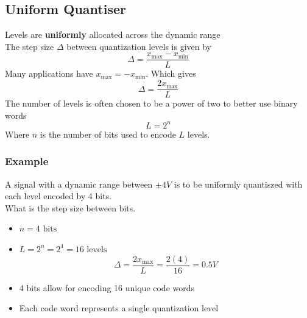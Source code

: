 \documentclass[oneside]{book}
\begin{document}
            \subsection{Uniform Quantiser}
                Levels are \textbf{uniformly} allocated across the dynamic range\\
                The step size $\Delta$ between quantization levels is given by
                \begin{equation*}
                    \Delta = \frac{x_{\text{max}} - x_{\text{min}}}{L}
                \end{equation*}
                Many applications have $x_{\text{max}} = -x_{\text{min}}$. Which gives
                \begin{equation*}
                    \Delta = \frac{2x_{\text{max}}}{L}
                \end{equation*}
                The number of levels is often chosen to be a power of two to better
                use binary words
                \begin{equation*}
                    L = 2^n
                \end{equation*}
                Where $n$ is the number of bits used to encode $L$ levels.
                \subsubsection{Example}
                    A signal with a dynamic range between $\pm 4V$ is to be uniformly quantiszed with each level encoded by 4 bits.\\
                    What is the step size between bits.
                    \begin{itemize}
                        \item $n = 4 \text{ bits}$
                        \item $L = 2^n = 2^4 = 16 \text{ levels}$
                        \begin{equation*}
                            \Delta = \frac{2x_{\text{max}}}{L} = \frac{2(4)}{16} = 0.5V
                        \end{equation*}
                        \item 4 bits allow for encoding 16 unique code words
                        \item Each code word represents a single quantization level
                    \end{itemize}
\end{document}
